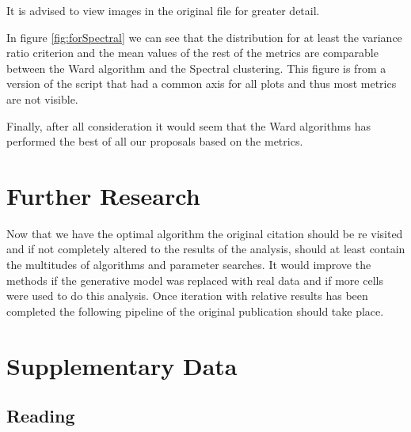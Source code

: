 \documentclass[12pt, a4paper]{article}
\begin{document}
                \begin{multicols}{2}

                It is advised to view images in the original file for greater detail.
                \newline

                In figure \ref{fig:forSpectral} we can see that the distribution for at least the variance ratio criterion and the mean values of the rest of the metrics are comparable between the Ward algorithm and the Spectral clustering. This figure is from a version of the script that had a common axis for all plots and thus most metrics are not visible.
                \newline

                Finally, after all consideration it would seem that the Ward algorithms has performed the best of all our proposals based on the metrics.
                \newline



        \section{Further Research}\label{sec:Further Research} %
        
            Now that we have the optimal algorithm the original citation should be re visited and if not completely altered to the results of the analysis, should at least contain the multitudes of algorithms and parameter searches. It would improve the methods if the generative model was replaced with real data and if more cells were used to do this analysis. Once iteration with relative results has been completed the following pipeline of the original publication should take place.
            \newline


        \section{Supplementary Data}\label{sec:Supplementary Data} %
        
            \subsection{Reading}\label{sub:Reading} %
        

\end{multicols}
\end{document}
